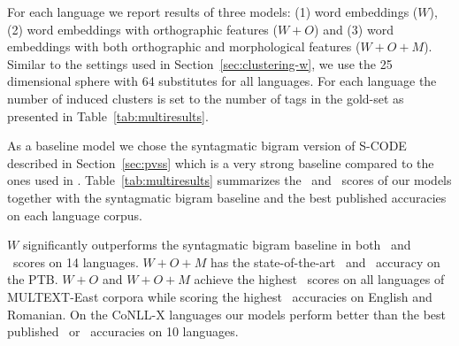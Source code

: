 
For each language we report results of three models: (1) word
embeddings ($W$), (2) word embeddings with orthographic features
($W+O$) and (3) word embeddings with both orthographic and
morphological features ($W+O+M$).  Similar to the settings used in
Section~\ref{sec:clustering-w}, we use the 25 dimensional sphere with 64
substitutes for all languages.  For each language the number of
induced clusters is set to the number of tags in the gold-set as
presented in Table~\ref{tab:multiresults}.

As a baseline model we chose the syntagmatic bigram version of S-CODE
described in Section~\ref{sec:pvss} which is a very strong baseline
compared to the ones used in
\cite{christodoulopoulos-goldwater-steedman:2011:EMNLP}.
Table~\ref{tab:multiresults} summarizes the \mto\ and \vm\ scores of
our models together with the syntagmatic bigram baseline and the best
published accuracies on each language corpus.

$W$ significantly outperforms the syntagmatic bigram baseline in both
\mto\ and \vm\ scores on 14 languages.  $W+O+M$ has the
state-of-the-art \mto\ and \vm\ accuracy on the PTB.  $W+O$ and
$W+O+M$ achieve the highest \mto\ scores on all languages of
MULTEXT-East corpora while scoring the highest \vm\ accuracies on
English and Romanian.  On the CoNLL-X languages our models perform
better than the best published \mto\ or \vm\ accuracies on 10
languages.

